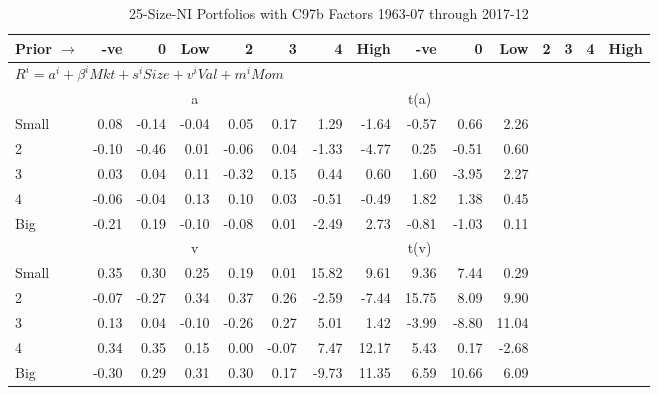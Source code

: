 
\begin{table}[!ht]
\footnotesize
\centering
\caption{25-Size-NI Portfolios with C97b Factors 1963-07 through 2017-12}
\begin{tabular}{lrrrrrrrrrrrrrr}
  \toprule
    Prior $\rightarrow$ & -ve & 0 & Low & 2 & 3 & 4 & High & -ve & 0 & Low & 2 & 3 & 4 & High \\ 
  \midrule
  \multicolumn{11}{l}{$R^i=a^i+\beta^iMkt+s^iSize+v^iVal+m^iMom$} \\

  
    
      & \multicolumn{5}{c}{a} & \multicolumn{5}{c}{t(a)}
    
    \\
      \cmidrule(r){2-6} \cmidrule(r){7-11}

    Small   & 0.08  & -0.14  & -0.04  & 0.05  & 0.17  & 1.29  & -1.64  & -0.57  & 0.66  & 2.26  \\
         2  & -0.10  & -0.46  & 0.01  & -0.06  & 0.04  & -1.33  & -4.77  & 0.25  & -0.51  & 0.60  \\
         3  & 0.03  & 0.04  & 0.11  & -0.32  & 0.15  & 0.44  & 0.60  & 1.60  & -3.95  & 2.27  \\
         4  & -0.06  & -0.04  & 0.13  & 0.10  & 0.03  & -0.51  & -0.49  & 1.82  & 1.38  & 0.45  \\
    Big     & -0.21  & 0.19  & -0.10  & -0.08  & 0.01  & -2.49  & 2.73  & -0.81  & -1.03  & 0.11  \\

  
    
      & \multicolumn{5}{c}{v} & \multicolumn{5}{c}{t(v)}
    
    \\
      \cmidrule(r){2-6} \cmidrule(r){7-11}

    Small   & 0.35  & 0.30  & 0.25  & 0.19  & 0.01  & 15.82  & 9.61  & 9.36  & 7.44  & 0.29  \\
         2  & -0.07  & -0.27  & 0.34  & 0.37  & 0.26  & -2.59  & -7.44  & 15.75  & 8.09  & 9.90  \\
         3  & 0.13  & 0.04  & -0.10  & -0.26  & 0.27  & 5.01  & 1.42  & -3.99  & -8.80  & 11.04  \\
         4  & 0.34  & 0.35  & 0.15  & 0.00  & -0.07  & 7.47  & 12.17  & 5.43  & 0.17  & -2.68  \\
    Big     & -0.30  & 0.29  & 0.31  & 0.30  & 0.17  & -9.73  & 11.35  & 6.59  & 10.66  & 6.09  \\

  
    

\end{tabular}
\end{table}
